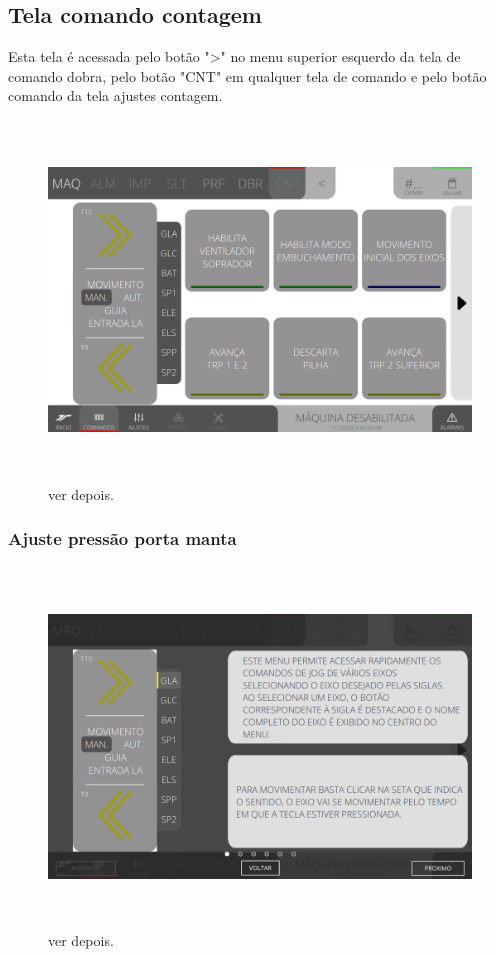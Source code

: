 \thispagestyle{fancy}
\vspace*{\fill}
\subsection{Tela comando contagem}
 Esta tela é acessada pelo botão "\textgreater" no menu superior esquerdo da tela de comando dobra, pelo botão "CNT" em qualquer tela de comando e pelo botão comando da tela ajustes contagem.
\begin{figure}[h]
  \centering
  \includegraphics[width=576px,height=360px]{src/imagesFlexo/08-count/commands/e-Tela-Principal.png}
  \caption{ver depois.}
   \label{}
\end{figure}

\newpage
\thispagestyle{fancy}
\vspace*{\fill}
\subsubsection{\small{Ajuste pressão porta manta}}
\begin{figure}[h]
  \centering
  \includegraphics[width=576px,height=360px]{src/imagesFlexo/08-count/commands/e-1.png}
  \caption{ver depois.}
   \label{}
\end{figure}
\vspace*{\fill}

